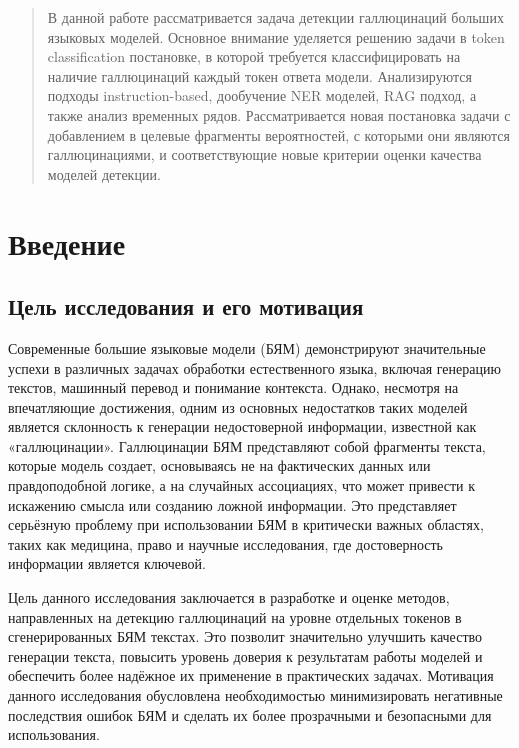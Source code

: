 \documentclass[12pt]{article}
\begin{document}
\clearpage
\tableofcontents
\clearpage

\begin{abstract}
В данной работе рассматривается задача детекции галлюцинаций больших языковых моделей. Основное внимание уделяется решению задачи в token classification постановке, в которой требуется классифицировать на наличие галлюцинаций каждый токен ответа модели. Анализируются подходы instruction-based, дообучение NER моделей, RAG подход, а также анализ временных рядов. Рассматривается новая постановка задачи с добавлением в целевые фрагменты вероятностей, с которыми они являются галлюцинациями, и соответствующие новые критерии оценки качества моделей детекции.

%
\end{abstract}


\section{Введение}
\subsection{Цель исследования и его мотивация}
Современные большие языковые модели (БЯМ) демонстрируют значительные успехи в различных задачах обработки естественного языка, включая генерацию текстов, машинный перевод и понимание контекста. Однако, несмотря на впечатляющие достижения, одним из основных недостатков таких моделей является склонность к генерации недостоверной информации, известной как «галлюцинации». Галлюцинации БЯМ представляют собой фрагменты текста, которые модель создает, основываясь не на фактических данных или правдоподобной логике, а на случайных ассоциациях, что может привести к искажению смысла или созданию ложной информации. Это представляет серьёзную проблему при использовании БЯМ в критически важных областях, таких как медицина, право и научные исследования, где достоверность информации является ключевой.

Цель данного исследования заключается в разработке и оценке методов, направленных на детекцию галлюцинаций на уровне отдельных токенов в сгенерированных БЯМ текстах. Это позволит значительно улучшить качество генерации текста, повысить уровень доверия к результатам работы моделей и обеспечить более надёжное их применение в практических задачах. Мотивация данного исследования обусловлена необходимостью минимизировать негативные последствия ошибок БЯМ и сделать их более прозрачными и безопасными для использования.
\end{document}
